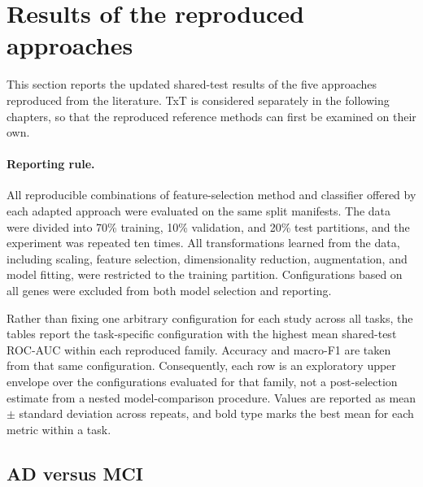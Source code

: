 \section{Results of the reproduced approaches}
\label{sec:sota-results}

This section reports the updated shared-test results of the five approaches reproduced from the literature. TxT is considered separately in the following chapters, so that the reproduced reference methods can first be examined on their own.

\paragraph{Reporting rule.}
All reproducible combinations of feature-selection method and classifier offered by each adapted approach were evaluated on the same split manifests. The data were divided into 70\% training, 10\% validation, and 20\% test partitions, and the experiment was repeated ten times. All transformations learned from the data, including scaling, feature selection, dimensionality reduction, augmentation, and model fitting, were restricted to the training partition. Configurations based on all genes were excluded from both model selection and reporting.

Rather than fixing one arbitrary configuration for each study across all tasks, the tables report the task-specific configuration with the highest mean shared-test ROC-AUC within each reproduced family. Accuracy and macro-F1 are taken from that same configuration. Consequently, each row is an exploratory upper envelope over the configurations evaluated for that family, not a post-selection estimate from a nested model-comparison procedure. Values are reported as mean \(\pm\) standard deviation across repeats, and bold type marks the best mean for each metric within a task.

\subsection*{AD versus MCI}

